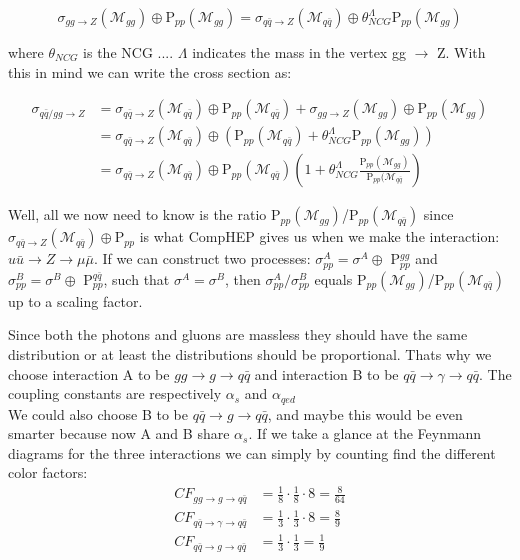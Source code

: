 \begin{equation}
\sigma_{gg\rightarrow Z} (\mathcal{M}_{gg}) \oplus \textrm{P}_{pp}(\mathcal{M}_{gg})=\sigma_{q \bar q\rightarrow Z}(\mathcal{M}_{q \bar q}) \oplus \theta_{NCG}^{\Lambda}\textrm{P}_{pp}(\mathcal{M}_{gg})
\end{equation}

where $\theta_{NCG}$ is the NCG .... $\Lambda$ indicates the mass in the vertex gg $\rightarrow$ Z. With this in mind we can write the cross section as:

\begin{align}
\sigma_{q \bar q/gg \rightarrow Z} &= \sigma_{q \bar q \rightarrow Z} (\mathcal{M}_{q \bar q}) \oplus \textrm{P}_{pp}(\mathcal{M}_{q \bar q})+ \sigma_{gg\rightarrow Z} (\mathcal{M}_{gg}) \oplus \textrm{P}_{pp}(\mathcal{M}_{gg})\nonumber \\ 
&= \sigma_{q \bar q\rightarrow Z}(\mathcal{M}_{q \bar q}) \oplus (\textrm{P}_{pp}(\mathcal{M}_{q \bar q})+\theta_{NCG}^{\Lambda}\textrm{P}_{pp}(\mathcal{M}_{gg}))\nonumber \\ 
&= \sigma_{q \bar q\rightarrow Z}(\mathcal{M}_{q \bar q}) \oplus \textrm{P}_{pp}(\mathcal{M}_{q \bar q}) \left ( 1+\theta_{NCG}^{\Lambda}\frac{\textrm{P}_{pp}(\mathcal{M}_{gg})}{\textrm{P}_{pp}(\mathcal{M}_{q \bar q}} \right )
\end{align}

Well, all we now need to know is the ratio P$_{pp}(\mathcal{M}_{gg})$/P$_{pp}(\mathcal{M}_{q \bar q})$ since $ \sigma_{q \bar q\rightarrow Z}(\mathcal{M}_{q \bar q}) \oplus \textrm{P}_{pp}$ is what CompHEP gives us when we make the interaction: $u \bar u \rightarrow Z \rightarrow \mu \bar \mu $. If we can construct two processes: $\sigma_{pp}^{A}=\sigma^{A} \oplus$ P$_{pp}^{gg}$ and $\sigma_{pp}^{B}=\sigma^{B} \oplus$ P$_{pp}^{q \bar q}$, such that $\sigma^{A}=\sigma^{B}$, then $\sigma_{pp}^{A}/\sigma_{pp}^{B}$ equals  P$_{pp}(\mathcal{M}_{gg})$/P$_{pp}(\mathcal{M}_{q \bar q})$ up to a scaling factor.

Since both the photons and gluons are massless they should have the same distribution or at least the distributions should be proportional. Thats why we choose interaction A to be $gg \rightarrow g \rightarrow q \bar q$ and interaction B to be $q \bar q \rightarrow \gamma \rightarrow q \bar q$. The coupling constants are respectively $\alpha_{s}$ and $\alpha_{qed}$\\


We could also choose B to be  $q \bar q \rightarrow g \rightarrow q \bar q$, and maybe this would be even smarter because now A and B share $\alpha_{s}$. If we take a glance at the Feynmann diagrams for the three interactions we can simply by counting find the different color factors:
\begin{align}
	CF_{gg \rightarrow g \rightarrow q \bar q}&=\frac{1}{8} \cdot \frac{1}{8} \cdot 8=\frac{8}{64}\\
	CF_{q \bar q \rightarrow \gamma \rightarrow q \bar q}&=\frac{1}{3} \cdot \frac{1}{3} \cdot 8=\frac{8}{9}\\
	CF_{q \bar q \rightarrow g \rightarrow q \bar q}&=\frac{1}{3} \cdot \frac{1}{3}=\frac{1}{9}
\end{align}

